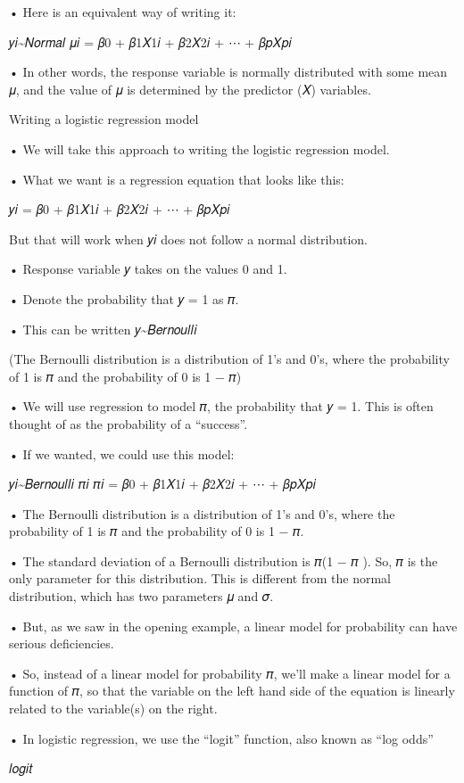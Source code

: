 \documentclass[
  letterpaper,
  DIV=11,
  numbers=noendperiod]{scrreprt}
\begin{document}
• Here is an equivalent way of writing it:

𝑦𝑖\textasciitilde 𝑁𝑜𝑟𝑚𝑎𝑙 𝜇𝑖 = 𝛽0 + 𝛽1𝑋1𝑖 + 𝛽2𝑋2𝑖 + ⋯ + 𝛽𝑝𝑋𝑝𝑖

• In other words, the response variable is normally distributed with
some mean 𝜇, and the value of 𝜇 is determined by the predictor (𝑋)
variables.

Writing a logistic regression model

• We will take this approach to writing the logistic regression model.

• What we want is a regression equation that looks like this:

𝑦𝑖 = 𝛽0 + 𝛽1𝑋1𝑖 + 𝛽2𝑋2𝑖 + ⋯ + 𝛽𝑝𝑋𝑝𝑖

But that will work when 𝑦𝑖 does not follow a normal distribution.

• Response variable 𝑦 takes on the values 0 and 1.

• Denote the probability that 𝑦 = 1 as 𝜋.

• This can be written 𝑦\textasciitilde 𝐵𝑒𝑟𝑛𝑜𝑢𝑙𝑙𝑖

(The Bernoulli distribution is a distribution of 1's and 0's, where the
probability of 1 is 𝜋 and the probability of 0 is 1 − 𝜋)

• We will use regression to model 𝜋, the probability that 𝑦 = 1. This is
often thought of as the probability of a ``success''.

• If we wanted, we could use this model:

𝑦𝑖\textasciitilde 𝐵𝑒𝑟𝑛𝑜𝑢𝑙𝑙𝑖 𝜋𝑖 𝜋𝑖 = 𝛽0 + 𝛽1𝑋1𝑖 + 𝛽2𝑋2𝑖 + ⋯ + 𝛽𝑝𝑋𝑝𝑖

• The Bernoulli distribution is a distribution of 1's and 0's, where the
probability of 1 is 𝜋 and the probability of 0 is 1 − 𝜋.

• The standard deviation of a Bernoulli distribution is 𝜋(1 − 𝜋 ). So, 𝜋
is the only parameter for this distribution. This is different from the
normal distribution, which has two parameters 𝜇 and 𝜎.

• But, as we saw in the opening example, a linear model for probability
can have serious deficiencies.

• So, instead of a linear model for probability 𝜋, we'll make a linear
model for a function of 𝜋, so that the variable on the left hand side of
the equation is linearly related to the variable(s) on the right.

• In logistic regression, we use the ``logit'' function, also known as
``log odds''

𝑙𝑜𝑔𝑖𝑡
\end{document}
